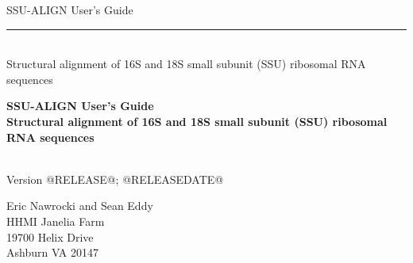 \begin{titlepage}
{\Large

\vspace*{\fill}

\begin{latexonly}
\noindent
{\Huge \textsf{SSU-ALIGN User's Guide}} \\ 
\rule[2pt]{\textwidth}{1pt} \\
\hspace*{\fill} {\large \textsf{Structural alignment of 16S and 18S small subunit
    (SSU) ribosomal RNA sequences}\\}
\end{latexonly}

\begin{htmlonly}
\begin{center}
{\Huge \textbf{SSU-ALIGN User's Guide}}\\
{\large \textbf{Structural alignment of 16S and 18S small subunit
    (SSU) ribosomal RNA sequences}}\\
\end{center}
\end{htmlonly}

\vspace*{\fill}

\begin{center}
\textsl{}\\
Version @RELEASE@; @RELEASEDATE@ \\ 

\vspace*{\fill}

Eric Nawrocki and Sean Eddy\\
HHMI Janelia Farm\\
19700 Helix Drive\\
Ashburn VA 20147\\
\textsl{} \\
\end{center}

\vspace*{\fill}

}
\end{titlepage}
